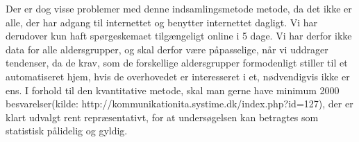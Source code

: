 
Der er dog visse problemer med denne indsamlingsmetode metode, da det ikke er alle, der har adgang til internettet og benytter internettet dagligt. Vi har derudover kun haft spørgeskemaet tilgængeligt online i 5 dage. Vi har derfor ikke data for alle aldersgrupper, og skal derfor være påpasselige, når vi uddrager tendenser, da de krav, som de forskellige aldersgrupper formodenligt stiller til et automatiseret hjem, hvis de overhovedet er interesseret i et, nødvendigvis ikke er ens. 
I forhold til den kvantitative metode, skal man gerne have minimum 2000 besvarelser(kilde: http://kommunikationita.systime.dk/index.php?id=127), der er klart udvalgt rent repræsentativt, for at undersøgelsen kan betragtes som statistisk pålidelig og gyldig.